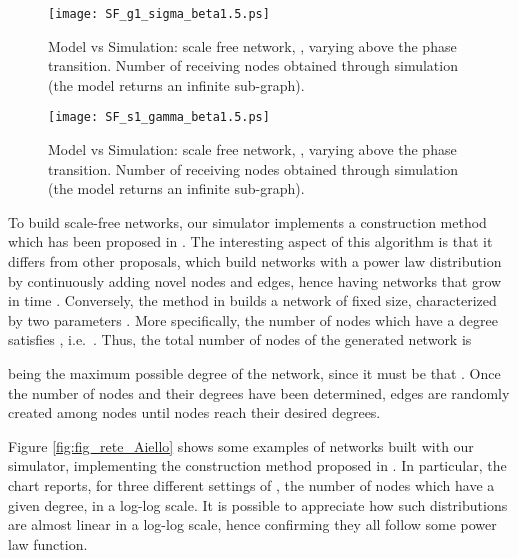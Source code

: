 \documentclass[10pt, conference, compsocconf]{IEEEtran}
\begin{document}
\begin{figure}[t]
   \centering
   \texttt{[image: SF\_g1\_sigma\_beta1.5.ps]}
   \caption{Model vs Simulation: scale free network, , varying  above the phase transition. Number of receiving nodes obtained through simulation (the model returns an infinite sub-graph).}
   \label{fig:SF_confronto_g_beta1.5}
\end{figure}

\begin{figure}[t]
   \centering
   \texttt{[image: SF\_s1\_gamma\_beta1.5.ps]}
   \caption{Model vs Simulation: scale free network, , varying  above the phase transition. Number of receiving nodes obtained through simulation (the model returns an infinite sub-graph).}
   \label{fig:SF_confronto_s_beta1.5}
\end{figure}

To build scale-free networks, our simulator implements a construction method which has been proposed in \cite{Aiello00arandom}.
The interesting aspect of this algorithm is that it differs from other proposals, which build networks with a power law distribution by continuously adding novel nodes and edges, hence having networks that grow in time \cite{Barabasi2000}. Conversely, the method in \cite{Aiello00arandom} builds a network of fixed size, characterized by two parameters . More specifically, 
the number of nodes  which have a degree  satisfies , i.e.~. Thus, the total number of nodes of the generated network is

being  the maximum possible degree of the network, since it must be that .
Once the number of nodes and their degrees have been determined, edges are randomly created among nodes until nodes reach their desired degrees.

Figure \ref{fig:fig_rete_Aiello} shows some examples of networks built with our simulator, implementing the construction method proposed in \cite{Aiello00arandom}. In particular, the chart reports, for three different settings of , the number of nodes which have a given degree, in a log-log scale. It is possible to appreciate how such distributions are almost linear in a log-log scale, hence confirming they all follow some power law function.
\end{document}
